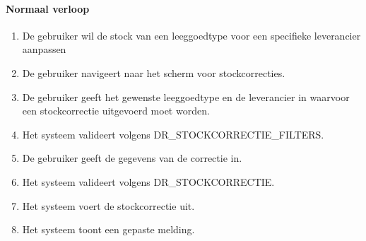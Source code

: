     \paragraph{Normaal verloop}
    \begin{enumerate}[nosep]
        \item De gebruiker wil de stock van een leeggoedtype voor een specifieke leverancier aanpassen
        \item De gebruiker navigeert naar het scherm voor stockcorrecties.
        \item De gebruiker geeft het gewenste leeggoedtype en de leverancier in waarvoor een stockcorrectie uitgevoerd moet worden.
        \item Het systeem valideert volgens DR\_STOCKCORRECTIE\_FILTERS.
        \item De gebruiker geeft de gegevens van de correctie in.
        \item Het systeem valideert volgens DR\_STOCKCORRECTIE.
        \item Het systeem voert de stockcorrectie uit.
        \item Het systeem toont een gepaste melding.
    \end{enumerate}

